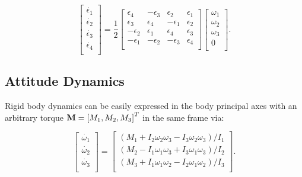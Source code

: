 \begin{equation} \label{eq:quat_kde}
    \left[\begin{matrix}\dot{\epsilon_1}\\\dot{\epsilon_2}\\\dot{\epsilon_3}\\\dot{\epsilon_4}\\\end{matrix}\right]
    =
    \frac{1}{2}\left[\begin{matrix}\epsilon_4&-\epsilon_3&\epsilon_2&\epsilon_1\\\epsilon_3&\epsilon_4&-\epsilon_1&\epsilon_2\\-\epsilon_2&\epsilon_1&\epsilon_4&\epsilon_3\\-\epsilon_1&-\epsilon_2&-\epsilon_3&\epsilon_4\\\end{matrix}\right]
    \left[\begin{matrix}\omega_1\\\omega_2\\\omega_3\\0\\\end{matrix}\right].
\end{equation} 

\subsection{Attitude Dynamics}

Rigid body dynamics can be easily expressed in the body principal axes with an arbitrary torque $\mathbf{M} = \left[M_1, M_2, M_3\right]^T$ in the same frame via:

\begin{equation} \label{eq:rbtf_dynamics}
    \left[\begin{matrix}\dot{\omega_1}\\\dot{\omega_2}\\\dot{\omega_3}\\\end{matrix}\right]
    =
    \left[\begin{matrix}
        \left(M_1+I_2\omega_2\omega_3-I_3\omega_2\omega_3\right) / I_1 \\
        \left(M_2-I_1\omega_1\omega_3+I_3\omega_1\omega_3\right) / I_2 \\
        \left(M_3+I_1\omega_1\omega_2-I_2\omega_1\omega_2\right) / I_3 \\
    \end{matrix}\right].
\end{equation}

